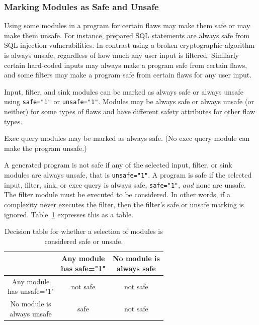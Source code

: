 \documentclass[12pt]{article}
\begin{document}
\subsubsection{Marking Modules as Safe and Unsafe}
\label{sec:safe or unsafe}

Using some modules in a program for certain flaws may make them safe or may make them
unsafe.  For instance, prepared SQL statements are always safe from SQL injection
vulnerabilities.  In contrast using a broken cryptographic algorithm is always
unsafe, regardless of how much any user input is filtered.  Similarly certain
hard-coded inputs may always make a program safe from certain flaws, and some filters
may make a program safe from certain flaws for any user input.

Input, filter, and sink modules can be marked as always safe or always unsafe using
\verb|safe="1"| or \verb|unsafe="1"|.  Modules may be always safe or always unsafe
(or neither) for some types of flaws and have different safety attributes for other
flaw types.

Exec query modules may be marked as always safe.  (No exec query module can make the
program unsafe.)

A generated program is not safe if any of the selected input, filter, or sink modules
are always unsafe, that is \verb|unsafe="1"|.  A program is safe if the selected
input, filter, sink, or exec query is always safe, \verb|safe="1"|, \emph{and} none
are unsafe.  The filter module must be executed to be considered.  In other words, if
a complexity never executes the filter, then the filter's safe or unsafe marking is
ignored.  Table~\ref{tab:selection safe algorithm} expresses this as a table.

\begin{table}[H]
\centering
\begin{tabular}{c|c|c|}
  & \makecell{Any module \\ has safe="1"}
  & \makecell{No module is \\ always safe} \\
\hline
\makecell{Any module \\ has unsafe="1"}  & not safe & not safe \\
\hline
\makecell{No module is \\ always unsafe} &   safe   & not safe \\
\hline
\end{tabular}
\caption{Decision table for whether a selection of modules is considered safe or unsafe.}
\label{tab:selection safe algorithm}
\end{table}
\end{document}
